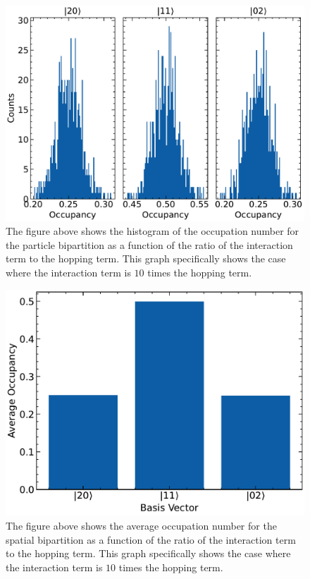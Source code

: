 \begin{figure}[H]
\centering
\includegraphics[scale=0.5]{../figures/sep_occ_hist_U_0.0001.pdf}
\caption{The figure above shows the histogram of the occupation number for the particle bipartition as a function of the ratio of the interaction term to the hopping term. This graph specifically shows the case where the interaction term is $10$ times the hopping term.}
\label{fig:sep_occ_hist_U_0.0001}
\end{figure}

\begin{figure}[H]
\centering
\includegraphics[scale=0.5]{../figures/spatial_avg_occ_U_0.0001.pdf}
\caption{The figure above shows the average occupation number for the spatial bipartition as a function of the ratio of the interaction term to the hopping term. This graph specifically shows the case where the interaction term is $10$ times the hopping term.}
\label{fig:spatial_avg_occ_U_0.0001}
\end{figure}


